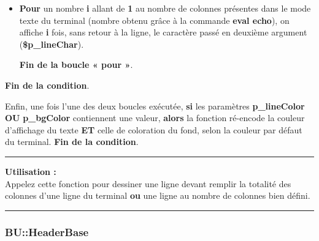 \documentclass[a4paper,10pt]{article}
\begin{document}
\begin{itemize}
    \item
    {
        \begin{justify}
            \textbf{\color{cyan}Pour} un nombre \textbf{\color{orange}i} allant de \textbf{\color{cyan}1} au nombre de colonnes présentes dans le mode texte du terminal (nombre obtenu grâce à la commande \textbf{\color{gray}eval echo}), on affiche \textbf{\color{orange}i} fois, sans retour à la ligne, le caractère passé en deuxième argument (\textbf{\color{orange}\$p\_lineChar}).
        \end{justify}\setlength{\parskip}{1em}

        \begin{justify}
            \textbf{\color{cyan}Fin de la boucle « pour »}.
        \end{justify}
    }
\end{itemize}

\begin{justify}
    \textbf{\color{brick}Fin de la condition}.
\end{justify}

\setlength{\parskip}{2em}


\begin{justify}
    Enfin, une fois l'une des deux boucles exécutée, \textbf{\color{brick}si} les paramètres \textbf{\color{orange}p\_lineColor} \textbf{\color{brick}OU} \textbf{\color{orange}p\_bgColor} contiennent une valeur, \textbf{\color{brick}alors} la fonction ré-encode la couleur d'affichage du texte \textbf{ET} celle de coloration du fond, selon la couleur par défaut du terminal. \textbf{\color{brick}Fin de la condition}.
\end{justify}\setlength{\parskip}{1em}

\par\noindent\rule{\textwidth}{0.4pt}

\begin{justify}
    \textbf{Utilisation :}\\[1\baselineskip]
    Appelez cette fonction pour dessiner une ligne devant remplir la totalité des colonnes d'une ligne du terminal \textbf{ou} une ligne au nombre de colonnes bien défini.
\end{justify}



\color{blue}\par\noindent\rule{\textwidth}{0.4pt}\color{white}

\color{blue}
\subsubsection{BU::HeaderBase}\color{white}
\end{document}
